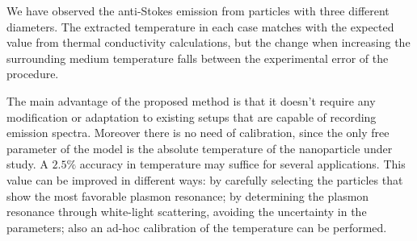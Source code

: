 \documentclass[journal=nalefd,manuscript=letter]{achemso}
\begin{document}
We have observed the anti-Stokes emission from particles with three different
diameters. The extracted temperature in each case matches with the expected
value from thermal conductivity calculations, but the change when increasing the
surrounding medium temperature falls between the experimental error of the
procedure.

The main advantage of the proposed method is that it doesn't require any
modification or adaptation to existing setups that are capable of recording
emission spectra. Moreover there is no need of calibration, since the only free
parameter of the model is the absolute temperature of the nanoparticle under
study. A $2.5\%$ accuracy in temperature may suffice for several applications.
This value can be improved in different ways: by carefully selecting the
particles that show the most favorable plasmon resonance; by determining the
plasmon resonance through white-light scattering, avoiding the uncertainty in
the parameters; also an ad-hoc calibration of the temperature can be
performed.


\end{document}
